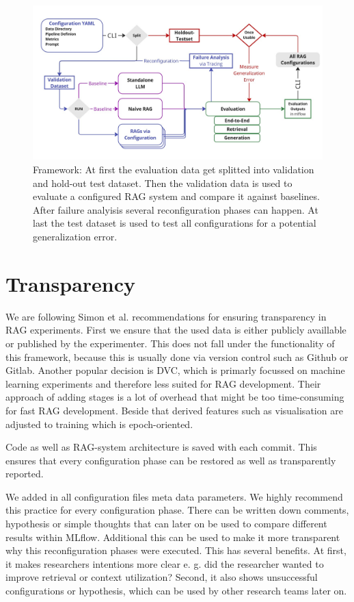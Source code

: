 \begin{figure}[h]
  \centering
  \includegraphics[width=\textwidth]{images/FrameworkFull.pdf}
  \caption{Framework: At first the evaluation data get splitted into validation and hold-out test dataset. Then the validation data is used to evaluate a configured RAG system and compare it against baselines. After failure analyisis several reconfiguration phases can happen. At last the test dataset is used to test all configurations for a potential generalization error.}
  \label{fig:framework-full}
\end{figure}


\section{Transparency}

We are following Simon et al.\cite{Simon.10112024} recommendations for ensuring transparency in RAG experiments. First we ensure that the used data is either publicly availlable or published by the experimenter. This does not fall under the functionality of this framework, because this is usually done via version control such as Github\cite{github-inc-2025} or Gitlab\cite{gitlab-inc-2025}. Another popular decision is DVC\cite{dvc.17.03.2025}, which is primarly focussed on machine learning experiments and therefore less suited for RAG development. Their approach of adding stages is a lot of overhead that might be too time-consuming for fast RAG development. Beside that derived features such as visualisation are adjusted to training which is epoch-oriented. 

Code as well as RAG-system architecture is saved with each commit. This ensures that every configuration phase can be restored as well as transparently reported. 

We added in all configuration files meta data parameters. We highly recommend this practice for every configuration phase. There can be written down comments, hypothesis or simple thoughts that can later on be used to compare different results within MLflow. Additional this can be used to make it more transparent why this reconfiguration phases were executed. This has several benefits.
At first, it makes researchers intentions more clear e. g. did the researcher wanted to improve retrieval or context utilization? 
Second, it also shows unsuccessful configurations or hypothesis, which can be used by other research teams later on.

